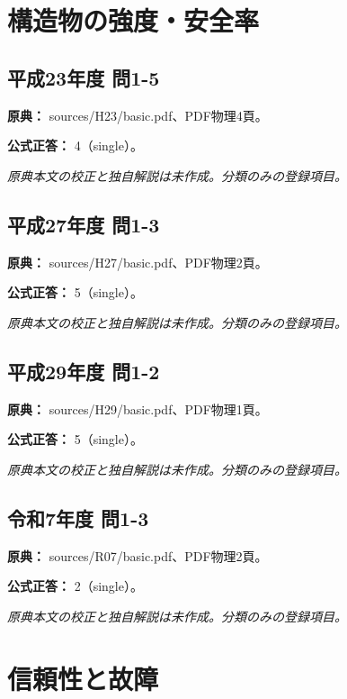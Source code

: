 \section{構造物の強度・安全率}

\subsection{平成23年度 問1-5}
\label{q:h23-reg-basic-1-5}

\noindent\textbf{原典：} sources/H23/basic.pdf、PDF物理4頁。

\textbf{公式正答：} 4（single）。

\par\textit{原典本文の校正と独自解説は未作成。分類のみの登録項目。}

\subsection{平成27年度 問1-3}
\label{q:h27-reg-basic-1-3}

\noindent\textbf{原典：} sources/H27/basic.pdf、PDF物理2頁。

\textbf{公式正答：} 5（single）。

\par\textit{原典本文の校正と独自解説は未作成。分類のみの登録項目。}

\subsection{平成29年度 問1-2}
\label{q:h29-reg-basic-1-2}

\noindent\textbf{原典：} sources/H29/basic.pdf、PDF物理1頁。

\textbf{公式正答：} 5（single）。

\par\textit{原典本文の校正と独自解説は未作成。分類のみの登録項目。}

\subsection{令和7年度 問1-3}
\label{q:r07-reg-basic-1-3}

\noindent\textbf{原典：} sources/R07/basic.pdf、PDF物理2頁。

\textbf{公式正答：} 2（single）。

\par\textit{原典本文の校正と独自解説は未作成。分類のみの登録項目。}

\section{信頼性と故障}

